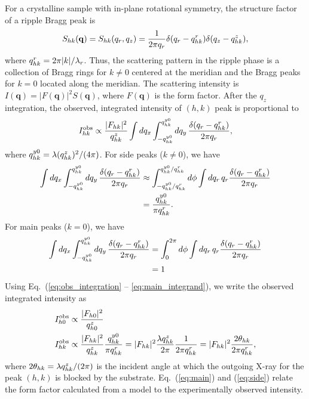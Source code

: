 For a crystalline sample with in-plane rotational symmetry, the
structure factor of a ripple Bragg peak is  
\begin{equation}
  S_{hk}(\mathbf{q}) = S_{hk}(q_r,q_z) 
  = \frac{1}{2\pi q_r}\delta(q_r-q_{hk}^r)\delta(q_z-q_{hk}^z),
\end{equation} 
where $q_{hk}^r=2\pi |k|/\lambda_r$. Thus, the scattering pattern in the 
ripple phase is a 
collection of Bragg rings for $k\neq 0$ centered at the meridian and the 
Bragg peaks for $k=0$ located along the meridian.  
The scattering intensity is $I(\mathbf{q})=|F(\mathbf{q})|^2S(\mathbf{q})$,
where $F(\mathbf{q})$ is the form factor. After the $q_z$ integration,
the observed, integrated intensity of $(h,k)$ peak is proportional to
\begin{equation}
  I_{hk}^\textrm{obs} 
    \propto \frac{\lvert F_{hk} \rvert^2}{q_{hk}^z} \int\mathop{dq_x} 
            \int_{-q_{hk}^{y0}}^{q_{hk}^{y0}}
            \mathop{dq_y} \frac{\delta(q_r-q_{hk}^r)}{2\pi q_r},
  \label{eq:obs_integration}
\end{equation}
where $q_{hk}^{y0} = \lambda (q_{hk}^z)^2/(4\pi)$.
For side peaks ($k \neq 0$), we have 
\begin{align}
  \int\mathop{dq_x} \int_{-q_{hk}^{y0}}^{q_{hk}^{y0}}\mathop{dq_y} \frac{\delta(q_r-q_{hk}^r)}{2\pi q_r}
  &\approx \int_{-q_{hk}^{y0}/q_{hk}^r}^{q_{hk}^{y0}/q_{hk}^r} \mathop{d\phi} 
          \int \mathop{dq_r} q_r\frac{\delta(q_r-q_{hk}^r)}{2\pi q_r} \nonumber\\
  &= \frac{q_{hk}^{y0}}{\pi q_{hk}^r}. 
  \label{eq:side_integrand}
\end{align}
For main peaks ($k=0$), we have 
\begin{align}
  \int\mathop{dq_x} \int_{-q_{hk}^{y0}}^{q_{hk}^{y0}}\mathop{dq_y} \frac{\delta(q_r-q_{hk}^r)}{2\pi q_r}
  &= \int_0^{2\pi}\mathop{d\phi} \int\mathop{dq_r} q_r\frac{\delta(q_r-q_{hk}^r)}{2\pi q_r} \nonumber\\
  &= 1 
  \label{eq:main_integrand}
\end{align}
Using Eq.~(\ref{eq:obs_integration} -- \ref{eq:main_integrand}), 
we write the observed integrated intensity as
\begin{align}
  I_{h0}^\textrm{obs} &\propto \frac{|F_{h0}|^2}{q_{h0}^z} \label{eq:main}\\
  I_{hk}^\textrm{obs} &\propto \frac{|F_{hk}|^2}{q_{hk}^z} \frac{q_{hk}^{y0}}{\pi q_{hk}^r}
    = |F_{hk}|^2 \frac{\lambda q_{hk}^z}{2\pi}\frac{1}{2\pi q_{hk}^r}
    = |F_{hk}|^2 \frac{2\theta_{hk}}{2\pi q_{hk}^r}, \label{eq:side}
\end{align}
where $2\theta_{hk} = \lambda q_{hk}^z/(2\pi)$ is the incident angle at which 
the outgoing X-ray for the peak $(h,k)$ is blocked by the substrate.
Eq.~(\ref{eq:main}) and (\ref{eq:side}) relate the form factor calculated from
a model to the experimentally observed intensity. 

